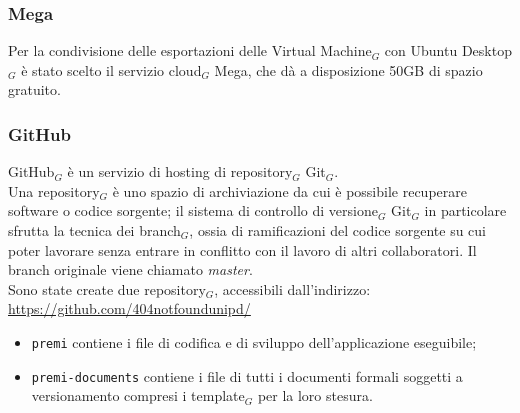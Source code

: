 \subsubsection{Mega}
Per la condivisione delle esportazioni delle Virtual Machine$_G$ con Ubuntu Desktop$_G$ è stato scelto il servizio cloud$_G$ Mega, che dà a disposizione 50GB di spazio gratuito.

\subsubsection{GitHub}
GitHub$_G$ è un servizio di hosting di repository$_G$ Git$_G$. \\
Una repository$_G$ è uno spazio di archiviazione da cui è possibile recuperare software o codice sorgente; il sistema di controllo di versione$_G$ Git$_G$ in particolare sfrutta la tecnica dei branch$_G$, ossia di ramificazioni del codice sorgente su cui poter lavorare senza  entrare in conflitto con il lavoro di altri collaboratori. Il branch originale viene chiamato \textit{master}. \\
Sono state create due repository$_G$, accessibili dall'indirizzo:\\ 
\url{https://github.com/404notfoundunipd/}
\begin{itemize}
\item \texttt{premi} contiene i file di codifica e di sviluppo dell'applicazione eseguibile;
\item \texttt{premi-documents} contiene i file di tutti i documenti formali soggetti a versionamento compresi i template$_G$ per la loro stesura.
\end{itemize}
